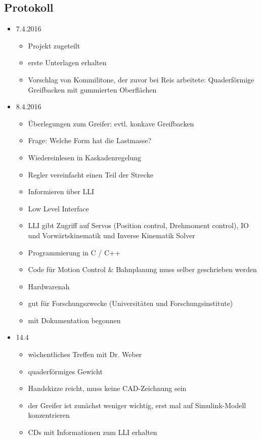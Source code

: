 \documentclass[a4paper,12pt]{article}
\begin{document}
\subsection{Protokoll}
\begin{itemize}
	\item 7.4.2016
	\begin{itemize}
		\item Projekt zugeteilt
		\item erste Unterlagen erhalten
		\item Vorschlag von Kommilitone, der zuvor bei Reis arbeitete: Quaderförmige Greifbacken mit gummierten Oberflächen
	\end{itemize}
	\item 8.4.2016
	\begin{itemize}
		\item Überlegungen zum Greifer: evtl. konkave Greifbacken
		\item Frage: Welche Form hat die Lastmasse?
		\item Wiedereinlesen in Kaskadenregelung
		\item Regler vereinfacht einen Teil der Strecke		
		\item Informieren über LLI
		\item Low Level Interface
		\item LLI gibt Zugriff auf Servos (Position control, Drehmoment control), IO und Vorwärtskinematik und Inverse Kinematik Solver
		\item Programmierung in C / C++
		\item Code für Motion Control \& Bahnplanung muss selber geschrieben werden
		\item Hardwarenah
		\item gut für Forschungszwecke (Universitäten und Forschungsinstitute)
		\item mit Dokumentation begonnen
	\end{itemize}
	\item 14.4
	\begin{itemize}
		\item wöchentliches Treffen mit Dr. Weber
		\item quaderförmiges Gewicht
		\item Handskizze reicht, muss keine CAD-Zeichnung sein
		\item der Greifer ist zunächst weniger wichtig, erst mal auf Simulink-Modell konzentrieren
		\item CDs mit Informationen zum LLI erhalten
	\end{itemize}

\end{itemize}
\end{document}
